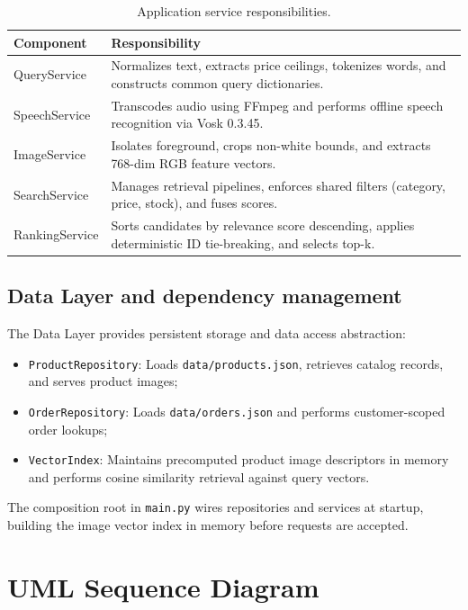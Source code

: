 \documentclass[12pt,a4paper]{article}
\newcommand{\code}[1]{\texttt{#1}}
\begin{document}
\begin{table}[htbp]\centering\small
\caption{Application service responsibilities.}\label{tab:services}
\begin{tabularx}{\textwidth}{@{}lL@{}}\toprule
\textbf{Component} & \textbf{Responsibility} \\\midrule
QueryService & Normalizes text, extracts price ceilings, tokenizes words, and constructs common query dictionaries. \\
SpeechService & Transcodes audio using FFmpeg and performs offline speech recognition via Vosk 0.3.45. \\
ImageService & Isolates foreground, crops non-white bounds, and extracts 768-dim RGB feature vectors. \\
SearchService & Manages retrieval pipelines, enforces shared filters (category, price, stock), and fuses scores. \\
RankingService & Sorts candidates by relevance score descending, applies deterministic ID tie-breaking, and selects top-k. \\
\bottomrule\end{tabularx}\end{table}

\subsection{Data Layer and dependency management}
The Data Layer provides persistent storage and data access abstraction:
\begin{itemize}
\item \code{ProductRepository}: Loads \code{data/products.json}, retrieves catalog records, and serves product images;
\item \code{OrderRepository}: Loads \code{data/orders.json} and performs customer-scoped order lookups;
\item \code{VectorIndex}: Maintains precomputed product image descriptors in memory and performs cosine similarity retrieval against query vectors.
\end{itemize}
The composition root in \code{main.py} wires repositories and services at startup, building the image vector index in memory before requests are accepted.

\FloatBarrier
\section{UML Sequence Diagram}\label{sec:sequence}
\end{document}
